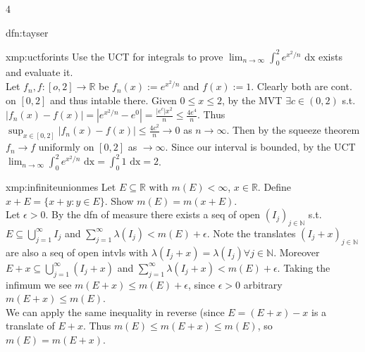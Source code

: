 \documentclass[landscape, 8pt]{extarticle}
\begin{document}
\begin{multicols*}{4}
\begin{dfn}{dfn:tayser}{ }
		\end{dfn}
		
		
		\begin{xmp}{xmp:uctforints}{ }
			Use the UCT for integrals to prove $\lim_{n\to \infty}\int_0^2 e^{x^2/n} \text{ dx}$ exists and evaluate it.\\
			Let $f_n, f : [o, 2] \to \mathbb{R}$ be $f_n(x) := e^{x^2/n}$ and $f(x):= 1$. Clearly both are cont. on $[0, 2]$ and thus intable there. Given $0 \le x \le 2$, by the MVT $\exists c\in (0, 2)$ s.t. $\left|f_n(x) - f(x)\right| = \left|e^{x^2/n} - e^0\right| = \frac{\left|e^c\right|x^2}{n} \le \frac{4e^4}{n}$. Thus $\sup_{x\in [0, 2]} \left|f_n(x) - f(x)\right| \le \frac{4c^2}{n} \to 0$ as $n \to \infty$. Then by the squeeze theorem $f_n \to f$ uniformly on $[0, 2]$ as $\to \infty$. Since our interval is bounded, by the UCT $\lim_{n\to \infty} \int_{0}^{2} e^{x^2/n} \text{ dx} = \int_{0}^{2} 1 \text{ dx} = 2$.
			
		\end{xmp}
		
		
		\begin{xmp}{xmp:infiniteunionmes}{ }
			Let $E \subseteq \mathbb{R}$ with $m(E) < \infty$, $x\in \mathbb{R}$. Define $x + E = \{x + y : y\in E\}$. Show $m(E) = m(x+E)$.\\
			Let $\epsilon > 0$. By the dfn of measure there exists a seq of open $(I_j)_{j\in \mathbb{N}}$ s.t. $E \subseteq \bigcup_{j=1}^\infty I_j$ and $\sum_{j=1}^{\infty} \lambda(I_j) < m(E)  +\epsilon$. Note the translates $(I_j + x)_{j\in \mathbb{N}}$ are also a seq of open intvls with $\lambda(I_j + x) = \lambda(I_j) \forall j\in \mathbb{N}$. Moreover $E + x \subseteq \bigcup_{j=1}^\infty (I_j + x)$ and $\sum_{j=1}^{\infty}\lambda(I_j + x) < m(E) +\epsilon$. Taking the infimum we see $m(E + x) \le m(E) +\epsilon$, since $\epsilon > 0$ arbitrary $m(E+x) \le m(E)$.\\
			We can apply the same inequality in reverse (since $E = (E+x) -x$ is a translate of $E+x$. Thus $m(E) \le m(E+x) \le m(E)$, so $m(E) = m(E+x)$.
		
		\end{xmp}
		

\end{multicols*}
\end{document}
